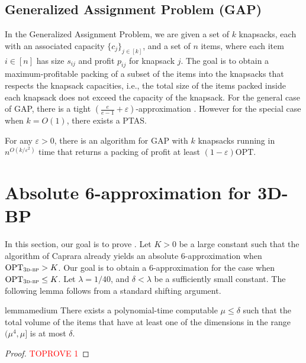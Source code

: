 \documentclass[a4paper,UKenglish,cleveref, autoref, thm-restate]{lipics-v2021}
\newcommand{\eps}{\varepsilon}
\newcommand{\opt}{\mathrm{OPT}}
\newcommand{\tbp}{\textsc{3d-bp}\xspace}
\begin{document}
\subsection{Generalized Assignment Problem (GAP)}
\label{sec:GAP}
In the Generalized Assignment Problem, we are given a set of $k$ knapsacks, each with an associated capacity $\{c_j\}_{j\in [k]}$, and a set of $n$ items, where each item $i\in [n]$ has size $s_{ij}$ and profit $p_{ij}$ for knapsack $j$. The goal is to obtain a maximum-profitable packing of a subset of the items into the knapsacks that respects the knapsack capacities, i.e., the total size of the items packed inside each knapsack does not exceed the capacity of the knapsack. For the general case of GAP, there is a tight $(\frac{e}{e-1}+\eps)$-approximation \cite{fleischer2011tight}. However for the special case when $k=O(1)$, there exists a PTAS.

\begin{theorem}
    For any $\eps > 0$, there is an algorithm for GAP with $k$ knapsacks running in $n^{O(k/\eps^2)}$ time that returns a packing of profit at least $(1-\eps)\opt$.
\end{theorem}








\section{Absolute 6-approximation for 3D-BP}
\label{sec:absolutesix}
In this section, our goal is to prove . Let $K>0$ be a large constant such that the algorithm of Caprara \cite{caprara2008packing} already yields an absolute 6-approximation when $\opt_{\tbp}>K$. Our goal is to obtain a 6-approximation for the case when $\opt_{\tbp} \le K$. 
Let $\lambda = 1/40$, and $\delta<\lambda$ be a sufficiently small constant. 
The following lemma follows from a standard shifting argument. 


\begin{restatable}{lemma}{medium}
\label{lem:medium}
    There exists a polynomial-time computable $\mu \le \delta$ such that the total volume of the items that have at least one of the dimensions in the range $(\mu^4,\mu]$ is at most $\delta$.
\end{restatable}

\begin{proof}\textcolor{red}{TOPROVE 1}\end{proof}
\end{document}
